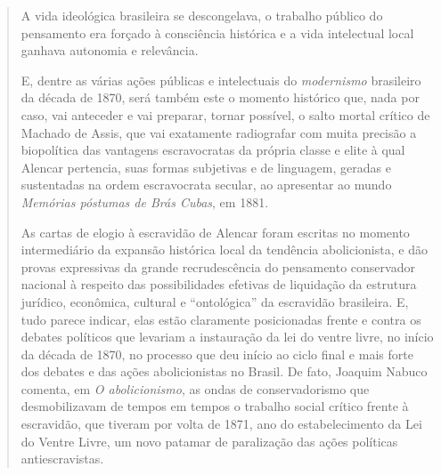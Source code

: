 \begin{quote}
A vida ideológica brasileira se descongelava, o trabalho público do
pensamento era forçado à consciência histórica e a vida intelectual
local ganhava autonomia e relevância.

E, dentre as várias ações públicas e intelectuais do \emph{modernismo}
brasileiro da década de 1870, será também este o momento histórico que,
nada por caso, vai anteceder e vai preparar, tornar possível, o salto
mortal crítico de Machado de Assis, que vai exatamente radiografar com
muita precisão a biopolítica das vantagens escravocratas da própria
classe e elite à qual Alencar pertencia, suas formas subjetivas e de
linguagem, geradas e sustentadas na ordem escravocrata secular, ao
apresentar ao mundo \emph{Memórias póstumas de Brás Cubas}, em 1881.

As cartas de elogio à escravidão de Alencar foram escritas no momento
intermediário da expansão histórica local da tendência abolicionista, e
dão provas expressivas da grande recrudescência do pensamento
conservador nacional à respeito das possibilidades efetivas de
liquidação da estrutura jurídico, econômica, cultural e ``ontológica''
da escravidão brasileira. E, tudo parece indicar, elas estão claramente
posicionadas frente e contra os debates políticos que levariam a
instauração da lei do ventre livre, no início da década de 1870, no
processo que deu início ao ciclo final e mais forte dos debates e das
ações abolicionistas no Brasil. De fato, Joaquim Nabuco comenta, em
\emph{O abolicionismo}, as ondas de conservadorismo que desmobilizavam
de tempos em tempos o trabalho social crítico frente à escravidão, que
tiveram por volta de 1871, ano do estabelecimento da Lei do Ventre
Livre, um novo patamar de paralização das ações políticas
antiescravistas.


\end{quote}
